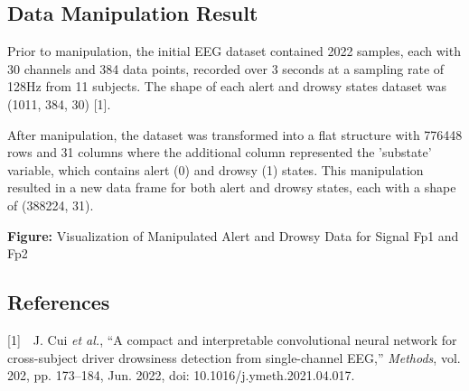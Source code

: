 \documentclass[letterpaper]{article}
\begin{document}
\bigskip

\subsection{Data Manipulation Result}
Prior to manipulation, the initial EEG dataset contained 2022 samples, each with 30 channels and 384 data points,
recorded over 3 seconds at a sampling rate of 128Hz from 11 subjects. The shape of each alert and drowsy states dataset
was (1011, 384, 30) [1]. 

After manipulation, the dataset was transformed into a flat structure with 776448 rows and 31 columns where the
additional column represented the 'substate' variable, which contains alert (0) and drowsy (1) states. This
manipulation resulted in a new data frame for both alert and drowsy states, each with a shape of (388224, 31).


\bigskip


\bigskip








\bigskip

{\centering
\textbf{Figure:} Visualization of Manipulated Alert and Drowsy Data for Signal Fp1 and Fp2
\par}


\bigskip

\subsection{References}
[1]\ \ J. Cui \textit{et al.}, “A compact and interpretable convolutional neural network for cross-subject driver
drowsiness detection from single-channel EEG,” \textit{Methods}, vol. 202, pp. 173–184, Jun. 2022, doi:
10.1016/j.ymeth.2021.04.017.
\end{document}
